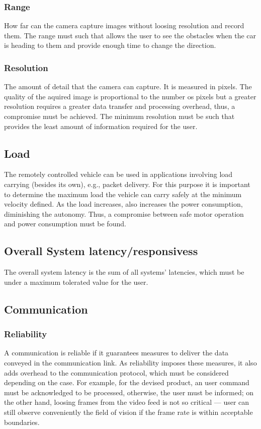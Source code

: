 \subsubsection{Range}%
\label{sec:orgecb044c}
How far can the camera capture images without loosing resolution and record them. The range must such that allows the user to see the obstacles when the car is heading to them and provide enough time to change the direction.
\subsubsection{Resolution}%
\label{sec:orgba87554}%
The amount of detail that the camera can capture. It is measured in pixels. The quality of the aquired image is proportional to the number os pixels but a greater resolution requires a greater data transfer and processing overhead, thus, a compromise must be achieved. The minimum resolution must be such that provides the least amount of information required for the user. 
\subsection{Load}%
\label{sec:orgca6a690}
The remotely controlled vehicle can be used in applications involving load
carrying (besides its own), e.g., packet delivery. For this purpose it is
important to determine the maximum load the vehicle can carry safely at the
minimum velocity deﬁned. As the load increases, also increases the power
consumption, diminishing the autonomy. Thus, a compromise between safe motor
operation and power consumption must be found.
\subsection{Overall System latency/responsivess}%
\label{sec:org7fd1829}
The overall system latency is the sum of all systems' latencies, which must be under a maximum tolerated value for the user.
\subsection{Communication}%
\label{sec:org4241610}
\subsubsection{Reliability}%
\label{sec:orgdcb920d}
A communication is reliable if it guarantees measures to deliver the data
conveyed in the communication link. As reliability imposes these measures, it
also adds overhead to the communication protocol, which must be considered
depending on the case. For example, for the devised product, an user command
must be acknowledged to be processed, otherwise, the user must be informed; on
the other hand, loosing frames from the video feed is not so critical — user can
still observe conveniently the ﬁeld of vision if the frame rate is within
acceptable boundaries.
